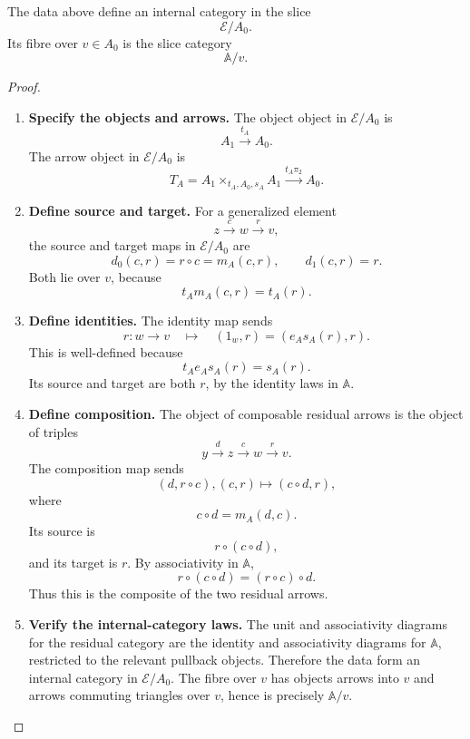 \begin{proposition}
\label{prop:residual-fibres-in-slice}
    The data above define an internal category in the slice
    \[
        \mathcal E/A_0.
    \]
    Its fibre over \(v\in A_0\) is the slice category
    \[
        \mathbb A/v.
    \]
\end{proposition}
\begin{proof}
    \leavevmode
    \begin{enumerate}
        \item \textbf{Specify the objects and arrows.} The object object in \(\mathcal E/A_0\) is
        \[
            A_1\xrightarrow{t_A}A_0.
        \]
        The arrow object in \(\mathcal E/A_0\) is
        \[
            T_A=A_1\times_{t_A,A_0,s_A}A_1
            \xrightarrow{t_A\pi_2}A_0.
        \]

        \item \textbf{Define source and target.} For a generalized element
        \[
            z\xrightarrow{c}w\xrightarrow{r}v,
        \]
        the source and target maps in \(\mathcal E/A_0\) are
        \[
            d_0(c,r)=r\circ c=m_A(c,r),
            \qquad
            d_1(c,r)=r.
        \]
        Both lie over \(v\), because
        \[
            t_A m_A(c,r)=t_A(r).
        \]

        \item \textbf{Define identities.} The identity map sends
        \[
            r:w\to v
            \quad\longmapsto\quad
            (1_w,r)=(e_As_A(r),r).
        \]
        This is well-defined because
        \[
            t_A e_A s_A(r)=s_A(r).
        \]
        Its source and target are both \(r\), by the identity laws in \(\mathbb A\).

        \item \textbf{Define composition.} The object of composable residual arrows is the object of triples
        \[
            y\xrightarrow{d}z\xrightarrow{c}w\xrightarrow{r}v.
        \]
        The composition map sends
        \[
            (d,r\circ c),(c,r)
            \longmapsto
            (c\circ d,r),
        \]
        where
        \[
            c\circ d=m_A(d,c).
        \]
        Its source is
        \[
            r\circ(c\circ d),
        \]
        and its target is \(r\). By associativity in \(\mathbb A\),
        \[
            r\circ(c\circ d)=(r\circ c)\circ d.
        \]
        Thus this is the composite of the two residual arrows.

        \item \textbf{Verify the internal-category laws.} The unit and associativity diagrams for the residual category are the identity and associativity diagrams for \(\mathbb A\), restricted to the relevant pullback objects. Therefore the data form an internal category in \(\mathcal E/A_0\). The fibre over \(v\) has objects arrows into \(v\) and arrows commuting triangles over \(v\), hence is precisely \(\mathbb A/v\).


\end{enumerate}
\end{proof}
